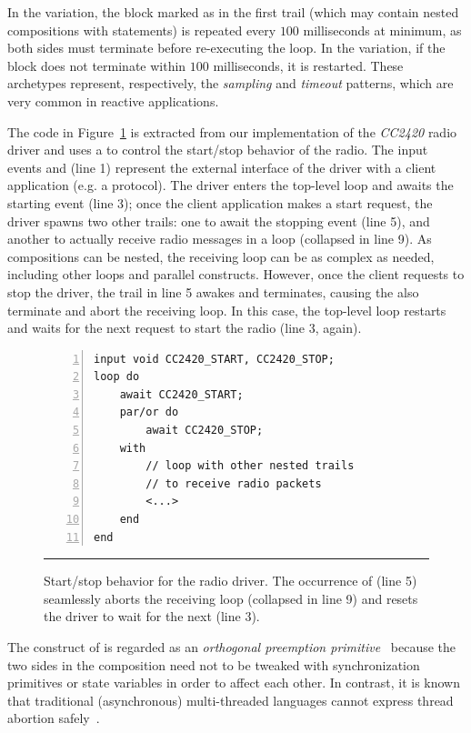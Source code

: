 In the  variation, the block marked as  in the first 
trail (which may contain nested compositions with  statements) is 
repeated every $100$ milliseconds at minimum, as both sides must terminate 
before re-executing the loop.
In the  variation, if the block does not terminate within $100$ 
milliseconds, it is restarted.
These archetypes represent, respectively, the \emph{sampling} and 
\emph{timeout} patterns, which are very common in reactive applications.

The code in Figure~\ref{lst.radio} is extracted from our implementation of the 
\emph{CC2420} radio driver and uses a  to control the start/stop 
behavior of the radio.
The input events  and  (line 1) 
represent the external interface of the driver with a client application (e.g.  
a protocol).
The driver enters the top-level loop and awaits the starting event (line 3);
once the client application makes a start request, the driver spawns two other 
trails:
one to await the stopping event (line 5),
and another to actually receive radio messages in a loop (collapsed in line 9).
%
As compositions can be nested, the receiving loop can be as complex as needed, 
including other loops and parallel constructs.
However, once the client requests to stop the driver, the trail in line 5 
awakes and terminates, causing the  also terminate and abort the 
receiving loop.
In this case, the top-level loop restarts and waits for the next request to 
start the radio (line 3, again).

\begin{figure}[t]
\begin{lstlisting}[numbers=left,xleftmargin=2em]
input void CC2420_START, CC2420_STOP;
loop do
    await CC2420_START;
    par/or do
        await CC2420_STOP;
    with
        // loop with other nested trails
        // to receive radio packets
        <...>
    end
end
\end{lstlisting}
\rule{14cm}{0.37pt}
\caption{ Start/stop behavior for the radio driver.\newline
{\small %
The occurrence of  (line 5) seamlessly aborts the receiving 
loop (collapsed in line 9) and resets the driver to wait for the next 
 (line 3).
}%
\label{lst.radio}
}
\end{figure}

The  construct of \CEU is regarded as an \emph{orthogonal 
preemption primitive}~\cite{esterel.preemption} because the two sides in the 
composition need not to be tweaked with synchronization primitives or state 
variables in
order to affect each other.
In contrast, it is known that traditional (asynchronous) multi-threaded 
languages cannot express thread abortion 
safely~\cite{esterel.preemption,sync_async.threadsstop}.

